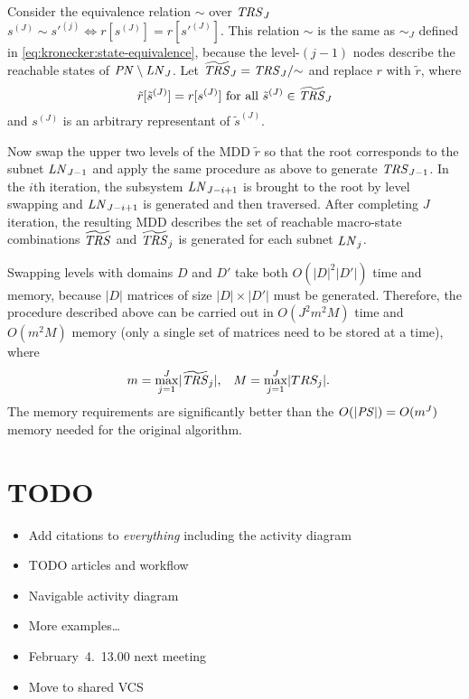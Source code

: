 \documentclass[a4paper,10pt,twoside,openright]{memoir}
\newcommand*{\PN}{\textnormal{\emph{PN}}}
\newcommand*{\LN}{\textnormal{\emph{LN}}}
\newcommand*{\TRS}{\textnormal{\emph{TRS}}}
\newcommand*{\PS}{\textnormal{\emph{PS}}}
\newcommand*{\macroS}{}\let\macroS\tilde
\newcommand*{\macroStates}{}\let\macroStates\widetilde
\newcommand*{\macroTRS}{\macroStates{\TRS}}
\begin{document}
Consider the equivalence relation ${\sim}$ over $\TRS_J$
$s^{(J)} \sim s'^{(j)} \Longleftrightarrow r[s^{(J)}] = r[s'^{(J)}]$.
This relation $\sim$ is the same as $\sim_J$ defined in
\eqref{eq:kronecker:state-equivalence}, because the level-$(j - 1)$
nodes describe the reachable states of $\PN \setminus \LN_J$. Let
$\macroTRS_J = \TRS_J /{\sim}$ and replace $r$ with $\macroS{r}$,
where
\begin{equation}
  \macroS{r}[\macroS{s}^{(J)}] = r[s^{(J)}] \text{ for all
    $\macroS{s}^{(J)} \in \macroTRS_J$}
\end{equation}
and $s^{(J)}$ is an arbitrary representant of $\macroS{s}^{(J)}$.

Now swap the upper two levels of the MDD $\macroS{r}$ so that the root
corresponds to the subnet $\LN_{J - 1}$ and apply the same procedure
as above to generate $\TRS_{J - 1}$. In the $i$th iteration, the
subsystem $\LN_{J - i + 1}$ is brought to the root by level swapping
and $\LN_{J - i + 1}$ is generated and then traversed. After
completing $J$ iteration, the resulting MDD describes the set of
reachable macro-state combinations $\macroTRS$ and $\macroTRS_j$ is
generated for each subnet $\LN_j$.

Swapping levels with domains $D$ and $D'$ take both
$O(\lvert D \rvert^2 \lvert D' \rvert)$ time and memory, because
$\lvert D \rvert$ matrices of size
$\lvert D \rvert \times \lvert D' \rvert$ must be
generated. Therefore, the procedure described above can be carried out
in $O(J^2 m^2 M)$ time and $O(m^2 M)$ memory (only a single set of
matrices need to be stored at a time), where
\begin{align}
  m &= \max_{j = 1}^J \lvert \macroTRS_j \rvert \text,
  & M &= \max_{j = 1}^J \lvert TRS_j \rvert \text.
\end{align}
The memory requirements are significantly better than the $O(\lvert
\PS \rvert) = O(m^J)$ memory needed for the original algorithm.

\section{TODO}

\begin{itemize}
\item Add citations to \emph{everything} including the activity
  diagram
\item TODO articles and workflow
\item Navigable activity diagram
\item More examples\ldots
\item February~4.~13.00 next meeting
\item Move to shared VCS
\end{itemize}

\backmatter

\printbibliography
\end{document}
